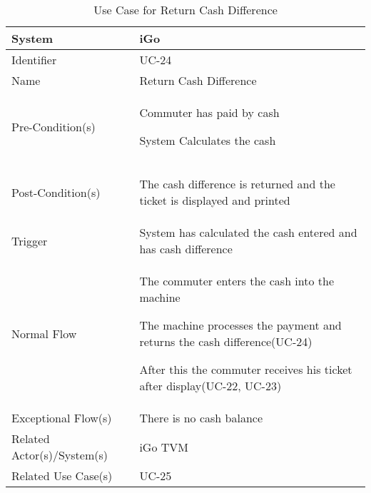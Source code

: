 \begin{table}[ht]
    \centering
    \begin{tabular}{|l|p{10cm}|}
        \hline
        System             & iGo\\
        \hline
        Identifier         & UC-24 \\
        \hline
        Name               & Return Cash Difference \\
        \hline
        Pre-Condition(s)   & 
        \begin{enumerate*}[itemjoin=\newline]
            \item Commuter has paid by cash 
            \item System Calculates the cash
        \end{enumerate*} \\
        \hline
        Post-Condition(s)  & 
        \begin{enumerate*}[itemjoin=\newline]
            \item The cash difference is returned and the ticket is displayed and printed
        \end{enumerate*} \\
        \hline
        Trigger            & System has calculated the cash entered and has cash difference \\
        \hline
        Normal Flow        & 
        \begin{enumerate*}[itemjoin=\newline]
            \item The commuter enters the cash into the machine
            \item The machine processes the payment and returns the cash difference(UC-24)
            \item After this the commuter receives his ticket after display(UC-22, UC-23)
        \end{enumerate*} \\
        \hline
        Exceptional Flow(s)& There is no cash balance\\
        \hline
        Related Actor(s)/System(s)   & iGo TVM\\
        \hline
        Related Use Case(s) & UC-25\\
        \hline
    \end{tabular}
    \caption{Use Case for Return Cash Difference}
    \label{tab:UC_returnCashDifference}
\end{table}


